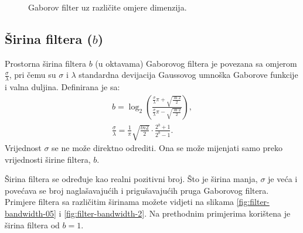 \documentclass{article}
\begin{document}
\begin{figure}[htb]
  \centering
  \hspace{50pt}
  \caption{Gaborov filter uz različite omjere dimenzija.}
  \label{fig:filter-ratios}
\end{figure}

\subsection{Širina filtera ($b$)}
Prostorna širina filtera $b$ (u oktavama) Gaborovog filtera je povezana sa
omjerom $\frac{\sigma}{\lambda}$, pri čemu su $\sigma$ i $\lambda$ standardna
devijacija Gaussovog umnoška Gaborove funkcije i valna duljina. Definirana je
sa:
\begin{eqnarray}
b = \log_2{\left (  \frac{\frac{\sigma}{\lambda}\pi + \sqrt{\frac{\ln2}{2}}}
{\frac{\sigma}{\lambda}\pi - \sqrt{\frac{\ln2}{2}}} \right )}, \\
\frac{\sigma}{\lambda} =
\frac{1}{\pi}\sqrt{\frac{ln2}{2}}\cdot\frac{2^b+1}{2^b-1}.
\end{eqnarray}
Vrijednost $\sigma$ se ne može direktno odrediti. Ona se može mijenjati samo
preko vrijednosti širine filtera, $b$.

Širina filtera se određuje kao realni pozitivni broj. Što je širina manja,
$\sigma$ je veća i povećava se broj naglašavajućih i prigušavajućih pruga
Gaborovog filtera. Primjere filtera sa
različitim širinama možete vidjeti na slikama \ref{fig:filter-bandwidth-05} i
\ref{fig:filter-bandwidth-2}. Na prethodnim primjerima korištena je širina
filtera od $b = 1$.
\end{document}
